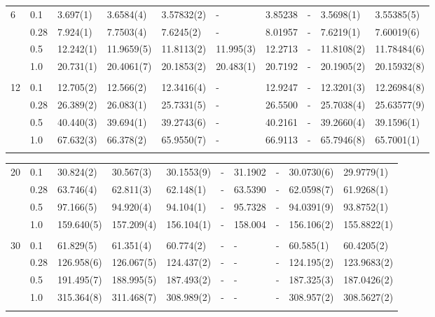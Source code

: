 {\begin{landscape}
\begin{table}
\begin{tabularx}{\hsize}{l:l|R{2.3cm}R{2.3cm}R{2.3cm}R{2.3cm}R{2.3cm}R{2.3cm}R{2.3cm}R{2.3cm}}
		6 & 0.1 & 3.697(1) & 3.6584(4) & 3.57832(2) & - & 3.85238 & - & 3.5698(1) & 3.55385(5) \\ 
		& 0.28 & 7.924(1) & 7.7503(4) & 7.6245(2) & - & 8.01957 & - & 7.6219(1) & 7.60019(6) \\
		& 0.5 & 12.242(1) & 11.9659(5) & 11.8113(2) & 11.995(3) & 12.2713 & - & 11.8108(2) & 11.78484(6) \\
		& 1.0 & 20.731(1) & 20.4061(7) & 20.1853(2) & 20.483(1) & 20.7192 & - & 20.1905(2) & 20.15932(8) \\ \hdashline \\
		
		12 & 0.1 & 12.705(2) & 12.566(2) & 12.3416(4) & - & 12.9247 & - & 12.3201(3) & 12.26984(8) \\ 
		& 0.28 & 26.389(2) & 26.083(1) & 25.7331(5) & - & 26.5500 & - & 25.7038(4) & 25.63577(9) \\
		& 0.5 & 40.440(3) & 39.694(1) & 39.2743(6) & - & 40.2161 & - & 39.2660(4) & 39.1596(1) \\
		& 1.0 & 67.632(3) & 66.378(2) & 65.9550(7) & - & 66.9113 & - & 65.7946(8) & 65.7001(1) \\ \hdashline
	\end{tabularx}
\end{table}

\begin{table}
	\begin{tabularx}{\hsize}{l:l|R{2.3cm}R{2.3cm}R{2.3cm}R{2.3cm}R{2.3cm}R{2.3cm}R{2.3cm}R{2.3cm}} \\
		\label{tab:quantumdotswinteraction2D2}
		20 & 0.1 & 30.824(2) & 30.567(3) & 30.1553(9) & - & 31.1902 & - & 30.0730(6) & 29.9779(1) \\ 
		& 0.28 & 63.746(4) & 62.811(3) & 62.148(1) & - & 63.5390 & - & 62.0598(7) & 61.9268(1) \\
		& 0.5 & 97.166(5) & 94.920(4) & 94.104(1) & - & 95.7328 & - & 94.0391(9) & 93.8752(1) \\
		& 1.0 & 159.640(5) & 157.209(4) & 156.104(1) & - & 158.004 & - & 156.106(2) & 155.8822(1) \\ \hdashline \\
		
		30 & 0.1 & 61.829(5) & 61.351(4) & 60.774(2) & - & - & - & 60.585(1) & 60.4205(2) \\ 
		& 0.28 & 126.958(6) & 126.067(5) & 124.437(2) & - & - & - & 124.195(2) & 123.9683(2) \\
		& 0.5 & 191.495(7) & 188.995(5) & 187.493(2) & - & - & - & 187.325(3) & 187.0426(2) \\
		& 1.0 & 315.364(8) & 311.468(7) & 308.989(2) & - & - & - & 308.957(2) & 308.5627(2) \\ \hdashline \\
		

\end{tabularx}
\end{table}
\end{landscape}}
